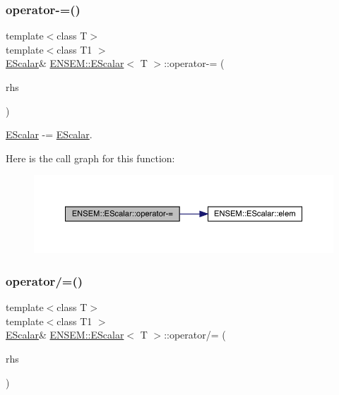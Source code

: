 \subsubsection{\texorpdfstring{operator-\/=()}{operator-=()}\hspace{0.1cm}{\footnotesize\ttfamily [2/2]}}
{\footnotesize\ttfamily template$<$class T$>$ \\
template$<$class T1 $>$ \\
\mbox{\hyperlink{classENSEM_1_1EScalar}{E\+Scalar}}\& \mbox{\hyperlink{classENSEM_1_1EScalar}{E\+N\+S\+E\+M\+::\+E\+Scalar}}$<$ T $>$\+::operator-\/= (\begin{DoxyParamCaption}\item[{const \mbox{\hyperlink{classENSEM_1_1EScalar}{E\+Scalar}}$<$ T1 $>$ \&}]{rhs }\end{DoxyParamCaption})\hspace{0.3cm}{\ttfamily [inline]}}



\mbox{\hyperlink{classENSEM_1_1EScalar}{E\+Scalar}} -\/= \mbox{\hyperlink{classENSEM_1_1EScalar}{E\+Scalar}}. 

Here is the call graph for this function\+:
\nopagebreak
\begin{figure}[H]
\begin{center}
\leavevmode
\includegraphics[width=350pt]{d0/d82/classENSEM_1_1EScalar_a2ed33688ab765d0e4d15b391b3f61f33_cgraph}
\end{center}
\end{figure}
\mbox{\label{classENSEM_1_1EScalar_a09524cf0f6f5baf9c421d03df58fe8d6}} 
\subsubsection{\texorpdfstring{operator/=()}{operator/=()}\hspace{0.1cm}{\footnotesize\ttfamily [1/2]}}
{\footnotesize\ttfamily template$<$class T$>$ \\
template$<$class T1 $>$ \\
\mbox{\hyperlink{classENSEM_1_1EScalar}{E\+Scalar}}\& \mbox{\hyperlink{classENSEM_1_1EScalar}{E\+N\+S\+E\+M\+::\+E\+Scalar}}$<$ T $>$\+::operator/= (\begin{DoxyParamCaption}\item[{const \mbox{\hyperlink{classENSEM_1_1EScalar}{E\+Scalar}}$<$ T1 $>$ \&}]{rhs }\end{DoxyParamCaption})\hspace{0.3cm}{\ttfamily [inline]}}




